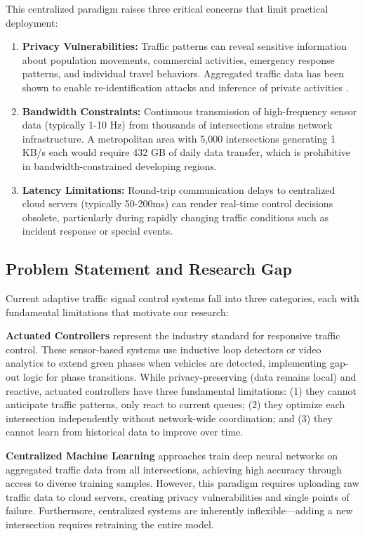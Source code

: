 \documentclass[conference]{IEEEtran}
\begin{document}
This centralized paradigm raises three critical concerns that limit practical deployment:

\begin{enumerate}
    \item \textbf{Privacy Vulnerabilities:} Traffic patterns can reveal sensitive information about population movements, commercial activities, emergency response patterns, and individual travel behaviors. Aggregated traffic data has been shown to enable re-identification attacks and inference of private activities \cite{de2013unique}.

    \item \textbf{Bandwidth Constraints:} Continuous transmission of high-frequency sensor data (typically 1-10 Hz) from thousands of intersections strains network infrastructure. A metropolitan area with 5,000 intersections generating 1 KB/s each would require 432 GB of daily data transfer, which is prohibitive in bandwidth-constrained developing regions.

    \item \textbf{Latency Limitations:} Round-trip communication delays to centralized cloud servers (typically 50-200ms) can render real-time control decisions obsolete, particularly during rapidly changing traffic conditions such as incident response or special events.
\end{enumerate}

\subsection{Problem Statement and Research Gap}
Current adaptive traffic signal control systems fall into three categories, each with fundamental limitations that motivate our research:

\textbf{Actuated Controllers} represent the industry standard for responsive traffic control. These sensor-based systems use inductive loop detectors or video analytics to extend green phases when vehicles are detected, implementing gap-out logic for phase transitions. While privacy-preserving (data remains local) and reactive, actuated controllers have three fundamental limitations: (1) they cannot anticipate traffic patterns, only react to current queues; (2) they optimize each intersection independently without network-wide coordination; and (3) they cannot learn from historical data to improve over time.

\textbf{Centralized Machine Learning} approaches train deep neural networks on aggregated traffic data from all intersections, achieving high accuracy through access to diverse training samples. However, this paradigm requires uploading raw traffic data to cloud servers, creating privacy vulnerabilities and single points of failure. Furthermore, centralized systems are inherently inflexible---adding a new intersection requires retraining the entire model.
\end{document}
